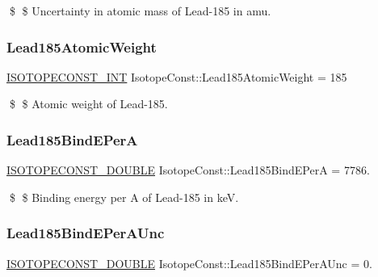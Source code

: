 \$ \$ Uncertainty in atomic mass of Lead-\/185 in amu. \mbox{\label{group___isotope_const-_lead-_pb185_gafbd4796f4bda168c51f88aa16a1d0bb8}} 
\subsubsection{\texorpdfstring{Lead185\+Atomic\+Weight}{Lead185AtomicWeight}}
{\footnotesize\ttfamily \mbox{\hyperlink{group___isotope_const-_macros_ga5f18360b3e99483a35c32d789e62621c}{I\+S\+O\+T\+O\+P\+E\+C\+O\+N\+S\+T\+\_\+\+I\+NT}} Isotope\+Const\+::\+Lead185\+Atomic\+Weight = 185}

\$ \$ Atomic weight of Lead-\/185. \mbox{\label{group___isotope_const-_lead-_pb185_ga9f881380ddd017188f65ecdf6db2112a}} 
\subsubsection{\texorpdfstring{Lead185\+Bind\+E\+PerA}{Lead185BindEPerA}}
{\footnotesize\ttfamily \mbox{\hyperlink{group___isotope_const-_macros_ga8f45a7272ce02c0b4c65c44636ed719a}{I\+S\+O\+T\+O\+P\+E\+C\+O\+N\+S\+T\+\_\+\+D\+O\+U\+B\+LE}} Isotope\+Const\+::\+Lead185\+Bind\+E\+PerA = 7786.}

\$ \$ Binding energy per A of Lead-\/185 in keV. \mbox{\label{group___isotope_const-_lead-_pb185_ga07c95247322a964dffc1fdd0f56ced6f}} 
\subsubsection{\texorpdfstring{Lead185\+Bind\+E\+Per\+A\+Unc}{Lead185BindEPerAUnc}}
{\footnotesize\ttfamily \mbox{\hyperlink{group___isotope_const-_macros_ga8f45a7272ce02c0b4c65c44636ed719a}{I\+S\+O\+T\+O\+P\+E\+C\+O\+N\+S\+T\+\_\+\+D\+O\+U\+B\+LE}} Isotope\+Const\+::\+Lead185\+Bind\+E\+Per\+A\+Unc = 0.}

